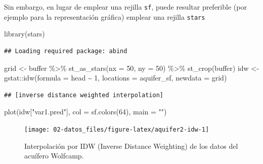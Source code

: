 \documentclass[
  spanish,
]{book}
\newenvironment{Shaded}{\begin{snugshade}}{\end{snugshade}}
\newcommand{\AttributeTok}[1]{\textcolor[rgb]{0.77,0.63,0.00}{#1}}
\newcommand{\DecValTok}[1]{\textcolor[rgb]{0.00,0.00,0.81}{#1}}
\newcommand{\FunctionTok}[1]{\textcolor[rgb]{0.00,0.00,0.00}{#1}}
\newcommand{\NormalTok}[1]{#1}
\newcommand{\OtherTok}[1]{\textcolor[rgb]{0.56,0.35,0.01}{#1}}
\newcommand{\SpecialCharTok}[1]{\textcolor[rgb]{0.00,0.00,0.00}{#1}}
\newcommand{\StringTok}[1]{\textcolor[rgb]{0.31,0.60,0.02}{#1}}
\theoremstyle{break}
\theoremstyle{definition}
\theoremstyle{definition}
\theoremstyle{definition}
\theoremstyle{definition}
\theoremstyle{remark}
\begin{document}
Sin embargo, en lugar de emplear una rejilla \texttt{sf}, puede resultar preferible (por ejemplo para la representación gráfica) emplear una rejilla \texttt{stars}

\begin{Shaded}
\begin{Highlighting}[]
\FunctionTok{library}\NormalTok{(stars)}
\end{Highlighting}
\end{Shaded}

\begin{verbatim}
## Loading required package: abind
\end{verbatim}

\begin{Shaded}
\begin{Highlighting}[]
\NormalTok{grid }\OtherTok{\textless{}{-}}\NormalTok{ buffer }\SpecialCharTok{\%\textgreater{}\%}  \FunctionTok{st\_as\_stars}\NormalTok{(}\AttributeTok{nx =} \DecValTok{50}\NormalTok{, }\AttributeTok{ny =} \DecValTok{50}\NormalTok{) }\SpecialCharTok{\%\textgreater{}\%} \FunctionTok{st\_crop}\NormalTok{(buffer)}
\NormalTok{idw }\OtherTok{\textless{}{-}}\NormalTok{ gstat}\SpecialCharTok{::}\FunctionTok{idw}\NormalTok{(}\AttributeTok{formula =}\NormalTok{ head }\SpecialCharTok{\textasciitilde{}} \DecValTok{1}\NormalTok{, }\AttributeTok{locations =}\NormalTok{ aquifer\_sf, }\AttributeTok{newdata =}\NormalTok{ grid)}
\end{Highlighting}
\end{Shaded}

\begin{verbatim}
## [inverse distance weighted interpolation]
\end{verbatim}

\begin{Shaded}
\begin{Highlighting}[]
\FunctionTok{plot}\NormalTok{(idw[}\StringTok{"var1.pred"}\NormalTok{], }\AttributeTok{col =} \FunctionTok{sf.colors}\NormalTok{(}\DecValTok{64}\NormalTok{), }\AttributeTok{main =} \StringTok{""}\NormalTok{)}
\end{Highlighting}
\end{Shaded}

\begin{figure}[!htb]

{\centering \texttt{[image: 02-datos\_files/figure-latex/aquifer2-idw-1]} 

}

\caption{Interpolación por IDW (Inverse Distance Weighting) de los datos del acuífero Wolfcamp.}\label{fig:aquifer2-idw}
\end{figure}
\end{document}

